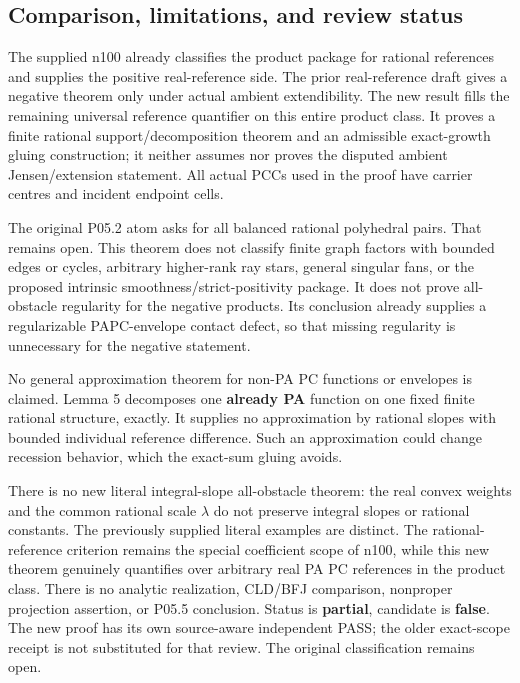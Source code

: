 \documentclass[
  11pt,
]{article}
\begin{document}
\subsection{Comparison, limitations, and review
status}\label{comparison-limitations-and-review-status}

The supplied n100 already classifies the product package for rational
references and supplies the positive real-reference side. The prior
real-reference draft gives a negative theorem only under actual ambient
extendibility. The new result fills the remaining universal reference
quantifier on this entire product class. It proves a finite rational
support/decomposition theorem and an admissible exact-growth gluing
construction; it neither assumes nor proves the disputed ambient
Jensen/extension statement. All actual PCCs used in the proof have
carrier centres and incident endpoint cells.

The original P05.2 atom asks for all balanced rational polyhedral pairs.
That remains open. This theorem does not classify finite graph factors
with bounded edges or cycles, arbitrary higher-rank ray stars, general
singular fans, or the proposed intrinsic smoothness/strict-positivity
package. It does not prove all-obstacle regularity for the negative
products. Its conclusion already supplies a regularizable PAPC-envelope
contact defect, so that missing regularity is unnecessary for the
negative statement.

No general approximation theorem for non-PA PC functions or envelopes is
claimed. Lemma 5 decomposes one \textbf{already PA} function on one
fixed finite rational structure, exactly. It supplies no approximation
by rational slopes with bounded individual reference difference. Such an
approximation could change recession behavior, which the exact-sum
gluing avoids.

There is no new literal integral-slope all-obstacle theorem: the real
convex weights and the common rational scale \(\lambda\) do not preserve
integral slopes or rational constants. The previously supplied literal
examples are distinct. The rational-reference criterion remains the
special coefficient scope of n100, while this new theorem genuinely
quantifies over arbitrary real PA PC references in the product class.
There is no analytic realization, CLD/BFJ comparison, nonproper
projection assertion, or P05.5 conclusion. Status is \textbf{partial},
candidate is \textbf{false}. The new proof has its own source-aware
independent PASS; the older exact-scope receipt is not substituted for
that review. The original classification remains open.
\end{document}
